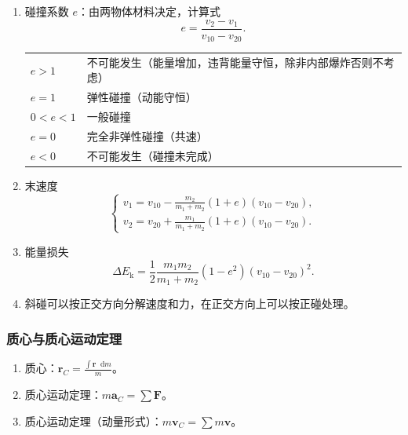\documentclass[UTF8,fontset=fandol,zihao=5]{ctexart}
\newcommand{\vect}[1]{\bm{#1}}
\newcommand{\dif}{\mathop{}\!\mathrm{d}}
\begin{document}
\begin{method}[【题型】正碰]
\begin{enumerate}
  \item 碰撞系数 \(e\)：由两物体材料决定，计算式
  \[
    e=\frac{v_2-v_1}{v_{10}-v_{20}}.
  \]

  \begin{center}
  \begin{tabularx}{0.92\textwidth}{>{\centering\arraybackslash}p{2cm}X}
  \toprule
  \(e>1\) & 不可能发生（能量增加，违背能量守恒，除非内部爆炸否则不考虑）\\
  \(e=1\) & 弹性碰撞（动能守恒）\\
  \(0<e<1\) & 一般碰撞\\
  \(e=0\) & 完全非弹性碰撞（共速）\\
  \(e<0\) & 不可能发生（碰撞未完成）\\
  \bottomrule
  \end{tabularx}
  \end{center}

  \item 末速度
  \[
    \begin{cases}
      \displaystyle v_1=v_{10}-\frac{m_2}{m_1+m_2}(1+e)(v_{10}-v_{20}),\\[6pt]
      \displaystyle v_2=v_{20}+\frac{m_1}{m_1+m_2}(1+e)(v_{10}-v_{20}).
    \end{cases}
  \]

  \item 能量损失
  \[
    \Delta E_{\mathrm k}=\frac12\frac{m_1m_2}{m_1+m_2}(1-e^2)(v_{10}-v_{20})^2.
  \]

  \item 斜碰可以按正交方向分解速度和力，在正交方向上可以按正碰处理。
\end{enumerate}
\end{method}

\subsubsection{质心与质心运动定理}

\begin{enumerate}
  \item 质心：\(\displaystyle\vect r_C=\frac{\int\vect r\dif m}{m}\)。
  \item 质心运动定理：\(m\vect a_C=\sum\vect F\)。
  \item 质心运动定理（动量形式）：\(m\vect v_C=\sum m\vect v\)。
\end{enumerate}
\end{document}
